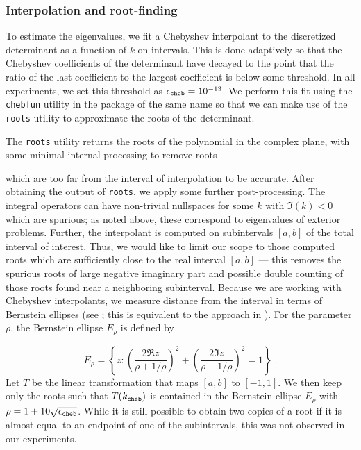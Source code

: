 \subsubsection{Interpolation and root-finding}

To estimate the eigenvalues, we fit a Chebyshev
interpolant to the discretized determinant as a
function of $k$ on intervals.
%
This is done adaptively so that the Chebyshev
coefficients of the determinant have decayed
to the point that the ratio of the last
coefficient to the largest coefficient is below
some threshold.
%
In all experiments, we set this threshold
as ${\epsilon_{\texttt{cheb}}} = 10^{-13}$.
%
We perform this fit using the \texttt{chebfun}
utility in the package of the same name
\cite{driscoll2014chebfun}
so that we can make use
of the \texttt{roots} utility to approximate
the roots of the determinant.

The \texttt{roots} utility returns the roots
of the polynomial in the complex plane, with
some minimal internal processing to remove
roots 
{\color{red}which are too far from the
  interval of interpolation to be accurate.
  After obtaining the output
  of \texttt{roots},
  we apply some further post-processing.
  The integral operators can
  have non-trivial nullspaces for some $k$ with
  $\Im(k) < 0$ which are spurious; as noted above,
  these correspond to eigenvalues of exterior
  problems. Further, the interpolant is computed
  on subintervals $[a,b]$ of the total interval
  of interest.
  Thus, we would like to limit our scope to
  those computed roots which are sufficiently
  close to the real interval $[a,b]$ --- this
  removes the spurious roots of large negative
  imaginary part and possible double
  counting of those roots found near a
  neighboring subinterval. Because we are working with
  Chebyshev interpolants, we measure
  distance from the interval in terms of
  Bernstein ellipses (see \cite{trefethen2013approximation};
  this is equivalent to the approach
  in \cite{zhao2015robust,barnettmpspack}).
  For the parameter $\rho$, the Bernstein ellipse
  $E_\rho$ is defined by

  $$ E_\rho = \left \{ z: \left(\frac{2\Re z}{\rho+1/\rho}
  \right )^2 + \left(\frac{2\Im z}{\rho-1/\rho}
  \right )^2  = 1 \right \} \; .$$
  Let $T$ be the linear transformation that
  maps $[a,b]$ to $[-1,1]$.
  We then keep only the roots such that
  $T(k_{\texttt{cheb}})$ is contained in the Bernstein
  ellipse $E_\rho$ with $\rho = 1+10\sqrt{{\epsilon_{\texttt{cheb}}}}$.
  While it is still possible to obtain two copies
  of a root if it is almost equal to an
  endpoint of one of the subintervals,
  this was not observed in our experiments.
}

